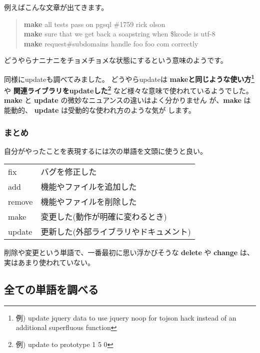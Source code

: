 \documentclass{jarticle}
\begin{document}
   例えばこんな文章が出てきます。
   \begin{quote}
    {\bf make} all tests pass on pgsql \#1759 rick olson\\
    {\bf make} sure that we get back a soapstring when \$kcode is utf-8\\
    {\bf make} request\#subdomains handle foo foo com correctly\\
   \end{quote}
   どうやらナニナニをチョメチョメな状態にするという意味のようです。

   同様にupdateも調べてみました。
   どうやらupdateは
   {\bf makeと同じような使い方{\footnote{例) update jquery data to use jquery noop for tojson hack instead of an additional superfluous function}}} や
   {\bf 関連ライブラリをupdateした{\footnote{例) update to prototype 1 5
   0 }}} など様々な意味で使われているようでした。
   {\bf make} と {\bf update} の微妙なニュアンスの違いはよく分かりません
   が、{\bf make} は能動的、 {\bf update} は受動的な使われ方のような気が
   します。

  \subsubsection{まとめ}
  自分がやったことを表現するには次の単語を文頭に使うと良い。
  \begin{table}[htbp]
   \begin{center}
    \begin{tabular}{ll}
     fix & バグを修正した \\
     add & 機能やファイルを追加した \\
     remove & 機能やファイルを削除した \\
     make & 変更した(動作が明確に変わるとき) \\
     update & 更新した(外部ライブラリやドキュメント) \\
    \end{tabular}
   \end{center}
  \end{table}

  削除や変更という単語で、一番最初に思い浮かびそうな {\bf delete} や {\bf change} は、
  実はあまり使われていない。

 \subsection{全ての単語を調べる}
\end{document}
